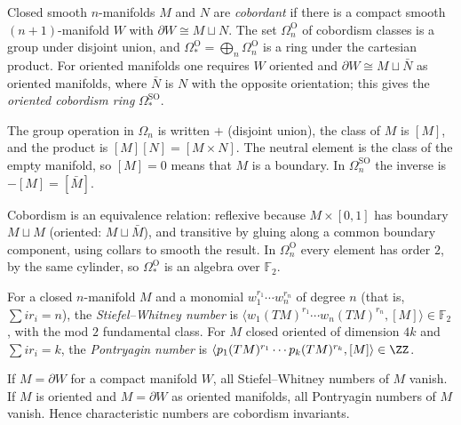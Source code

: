\begin{definition}\label{k-theory:definition-cobordism}
Closed smooth $n$-manifolds $M$ and $N$ are \emph{cobordant} if there is a compact smooth $(n + 1)$-manifold $W$ with $\partial W \cong M \sqcup N$. The set $\Omega_n^{\mathrm{O}}$ of cobordism classes is a group under
disjoint union, and $\Omega_*^{\mathrm{O}} = \bigoplus_n\Omega_n^{\mathrm{O}}$ is a ring under the cartesian product. For oriented manifolds one requires $W$ oriented and $\partial W \cong M \sqcup \bar{N}$ as oriented
manifolds, where $\bar{N}$ is $N$ with the opposite orientation; this gives the \emph{oriented cobordism ring} $\Omega_*^{\mathrm{SO}}$.
\end{definition}

\begin{notation}\label{k-theory:notation-cobordism}
The group operation in $\Omega_n$ is written $+$ (disjoint union), the class of $M$ is $[M]$, and the product is $[M][N] = [M \times N]$. The neutral element is the class of the empty manifold, so
$[M] = 0$ means that $M$ is a boundary. In $\Omega^{\mathrm{SO}}_n$ the inverse is $-[M] = [\bar{M}]$.
\end{notation}

Cobordism is an equivalence relation: reflexive because $M \times [0, 1]$ has boundary $M \sqcup M$ (oriented: $M \sqcup \bar{M}$), and transitive by gluing along a common boundary component, using collars to smooth
the result. In $\Omega^{\mathrm{O}}_n$ every element has order $2$, by the same cylinder, so $\Omega^{\mathrm{O}}_*$ is an algebra over $\mathbb{F}_2$.

\begin{definition}\label{k-theory:definition-characteristic-numbers}
For a closed $n$-manifold $M$ and a monomial $w_1^{r_1}\cdots w_n^{r_n}$ of degree $n$ (that is, $\sum ir_i = n$), the \emph{Stiefel--Whitney number} is
$\langle w_1(TM)^{r_1}\cdots w_n(TM)^{r_n}, [M]\rangle \in \mathbb{F}_2$, with the mod $2$ fundamental class. For $M$ closed oriented of dimension $4k$ and $\sum ir_i = k$, the \emph{Pontryagin number} is
$\langle p_1(TM)^{r_1}\cdots p_k(TM)^{r_k}, [M]\rangle \in \ZZ$.
\end{definition}

\begin{theorem}[Pontryagin]\label{k-theory:theorem-pontryagin}
If $M = \partial W$ for a compact manifold $W$, all Stiefel--Whitney numbers of $M$ vanish. If $M$ is oriented and $M = \partial W$ as oriented manifolds, all Pontryagin numbers of $M$ vanish. Hence characteristic numbers are
cobordism invariants.
\end{theorem}

